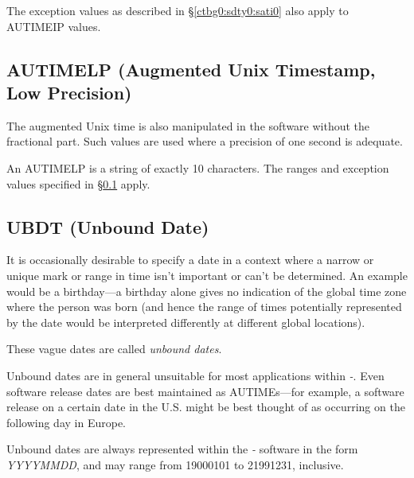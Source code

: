 The exception values as described in \S{}\ref{ctbg0:sdty0:sati0}
also apply to AUTIMEIP values.


\subsection{AUTIMELP (Augmented Unix Timestamp, Low Precision)}
\label{ctbg0:sdty0:sati1}

The augmented Unix time is also manipulated in the
software without the fractional part.  Such values are used where
a precision of one second is adequate.

An AUTIMELP is a string of exactly 10 characters.
The ranges and exception values specified in 
\S{}\ref{ctbg0:sdty0:sati1} apply.


\subsection{UBDT (Unbound Date)}
\label{ctbg0:sdty0:subd0}

It is occasionally desirable to specify a date in a context where a narrow
or unique mark or range in time isn't important or can't be determined.
An example would be
a birthday---a birthday alone gives no indication of the global time zone
where the person was born (and hence the range of times
potentially represented by the date
would be interpreted differently at different global locations).

These vague dates are called \emph{unbound dates}. 

Unbound dates are in general unsuitable for most applications within 
\emph{\productbasename{}-\productversion{}}\@.  Even software release dates
are best maintained as AUTIMEs---for example, a software release on a
certain date in the U.S.
might be best thought of as occurring on the following day in Europe.

Unbound dates are always represented within the
\emph{\productbasename{}-\productversion{}} software in the form
\emph{YYYYMMDD}, and may range from 19000101 to 
21991231, inclusive.

